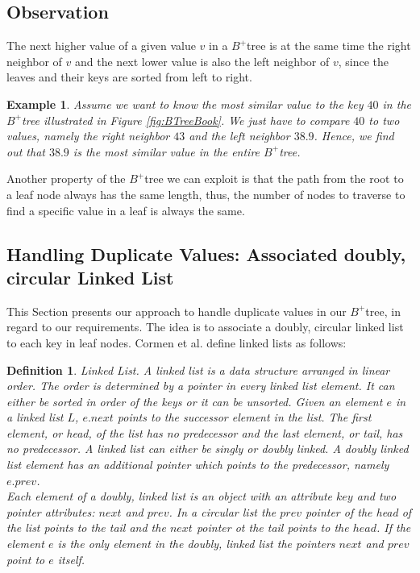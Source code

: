 \documentclass[abstracton,12pt,oneside]{scrreprt}
\newtheorem{definition}{Definition}
\newtheorem{example}{Example}
\begin{document}
\subsection{Observation}
The next higher value of a given value $v$ in a $B^+$tree is at the same time the right neighbor of $v$ and the next lower value is also the left neighbor of $v$, since the leaves and their keys are sorted from left to right.
\begin{example}
	Assume we want to know the most similar value to the key $40$ in the $B^+$tree illustrated in Figure \ref{fig:BTreeBook}. We just have to compare $40$ to two values, namely the right neighbor $43$ and the left neighbor $38.9$. Hence, we find out that $38.9$ is the most similar value in the entire $B^+$tree. 
\end{example}
Another property of the $B^+$tree we can exploit is that the path from the root to a leaf node always has the same length, thus, the number of nodes to traverse to find a specific value in a leaf is always the same. 

\subsection{Handling Duplicate Values: Associated doubly, circular Linked List}
\label{sec:allowDV}
This Section presents our approach to handle duplicate values in our $B^+$tree, in regard to our requirements. 
\label{doublyLinked}
The idea is to associate a doubly, circular linked list to each key in leaf nodes. Cormen et al.\cite{LinkedListBook} define linked lists as follows: 
\begin{definition}
	Linked List. A linked list is a data structure arranged in linear order. The order is determined by a pointer in every linked list element. It can either be sorted in order of the keys or it can be unsorted. Given an element $e$ in a linked list $L$, $e.next$ points to the successor element in the list. The first element, or head, of the list has no predecessor and the last element, or tail, has no predecessor. A linked list can either be singly or doubly linked. A doubly linked list element has an additional pointer which points to the predecessor, namely $e.prev$.\\
	Each element of a doubly, linked list is an object with an attribute $key$ and two pointer attributes: $next$ and $prev$. In a circular list the $prev$ pointer of the head of the list points to the tail and the $next$ pointer ot the tail points to the $head$. If the element $e$ is the only element in the doubly, linked list the pointers $next$ and $prev$ point to $e$ itself. 
\end{definition}
\end{document}
